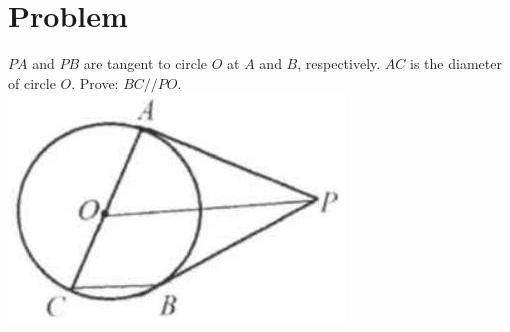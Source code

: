 \documentclass{article}
\begin{document}
\section*{Problem}
\(P A\) and \(P B\) are tangent to circle \(O\) at \(A\) and \(B\), respectively. \(A C\) is the diameter of circle \(O\). Prove: \(B C / / P O\).\\
\centering
\includegraphics[width=\textwidth]{images/169(4).jpg}
\end{document}
